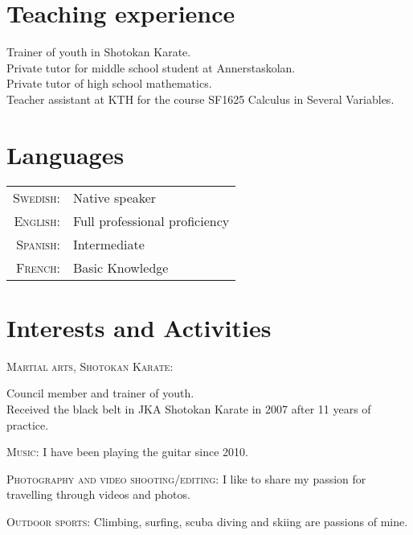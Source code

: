 \documentclass[a4paper,10pt]{article}
\begin{document}
{\section{Teaching experience}
\textbullet Trainer of youth in Shotokan Karate. \\ 
\textbullet Private tutor for middle school student at Annerstaskolan. \\
\textbullet Private tutor of high school mathematics. \\
\textbullet Teacher assistant at KTH for  the course SF1625 Calculus in Several Variables.  


\section{Languages}
\begin{tabular}{rl}
 \textsc{Swedish:}& Native speaker\\
\textsc{English:}&Full professional proficiency\\
\enspace \textsc{Spanish:} & Intermediate\\
\textsc{French:}&Basic Knowledge\\
\end{tabular}
 
\section{Interests and Activities}
\textsc{Martial arts, Shotokan Karate}: \footnotesize{Council member and trainer of youth. \\ Received the black belt in JKA Shotokan Karate in 2007 after 11 years of practice. 

\textsc{Music}: \footnotesize{I have been playing the guitar since 2010.}

\textsc{Photography and video shooting/editing}: \footnotesize{I like to share my passion for travelling through videos and photos.}

\textsc{Outdoor sports}: \footnotesize{Climbing, surfing, scuba diving and skiing are passions of mine.}

 
}}
\end{document}
